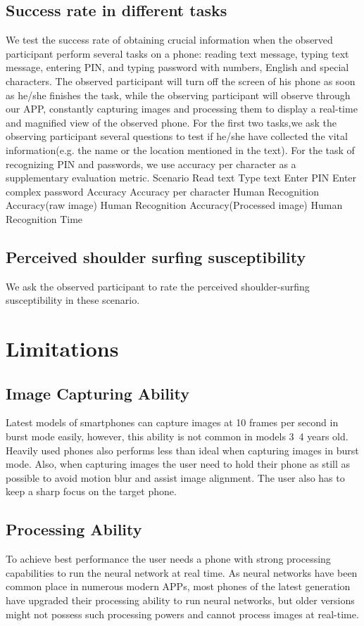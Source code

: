 \subsection{Success rate in different tasks}
We test the success rate of obtaining crucial information when the observed participant perform several tasks on a phone: reading text message, typing text message, entering PIN, and typing password with numbers, English and special characters. The observed participant will turn off the screen of his phone as soon as he/she finishes the task, while the observing participant will observe through our APP, constantly capturing images and processing them to display a real-time and magnified view of the observed phone. For the first two tasks,we ask the observing participant several questions to test if he/she have collected the vital information(e.g. the name or the location mentioned in the text). For the task of recognizing PIN and passwords, we use accuracy per character as a supplementary evaluation metric.
Scenario	Read text	Type text	Enter PIN	Enter complex password
Accuracy				
Accuracy per character				
Human Recognition Accuracy(raw image)				
Human Recognition Accuracy(Processed image)				
Human Recognition Time				
\subsection{Perceived shoulder surfing susceptibility}
We ask the observed participant to rate the perceived shoulder-surfing susceptibility in these scenario.
\section{Limitations}
\subsection{Image Capturing Ability}
Latest models of smartphones can capture images at 10 frames per second in burst mode easily, however, this ability is not common in models 3~4 years old. Heavily used phones also performs less than ideal when capturing images in burst mode. Also, when capturing images the user need to hold their phone as still as possible to avoid motion blur and assist image alignment. The user also has to keep a sharp focus on the target phone.
\subsection{Processing Ability}
To achieve best performance the user needs a phone with strong processing capabilities to run the neural network at real time. As neural networks have been common place in numerous modern APPs, most phones of the latest generation have upgraded their processing ability to run neural networks, but older versions might not possess such processing powers and cannot process images at real-time.
